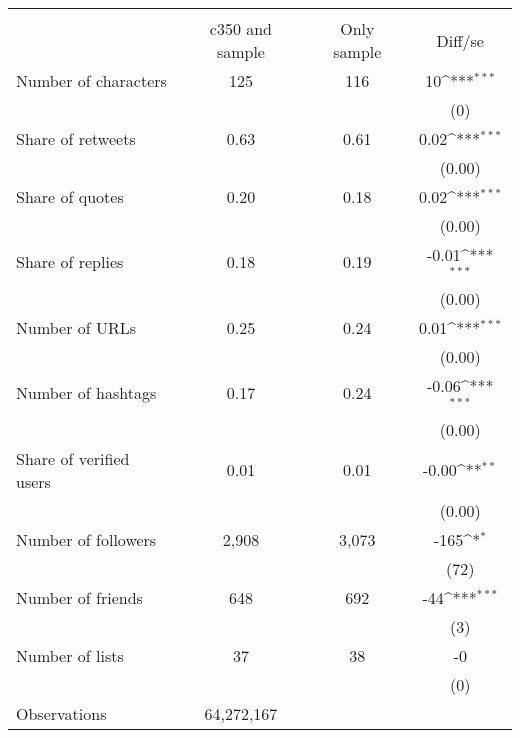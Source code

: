 {
\def\sym#1{\ifmmode^{#1}\else\(^{#1}\)\fi}
\begin{tabular}{l*{1}{ccc}}
\hline\hline
                    &\multicolumn{3}{c}{}                           \\
                    &c350 and sample& Only sample&     Diff/se         \\
\hline
Number of characters&         125&         116&          10\sym{***}\\
                    &            &            &         (0)         \\
Share of retweets   &        0.63&        0.61&        0.02\sym{***}\\
                    &            &            &      (0.00)         \\
Share of quotes     &        0.20&        0.18&        0.02\sym{***}\\
                    &            &            &      (0.00)         \\
Share of replies    &        0.18&        0.19&       -0.01\sym{***}\\
                    &            &            &      (0.00)         \\
Number of URLs      &        0.25&        0.24&        0.01\sym{***}\\
                    &            &            &      (0.00)         \\
Number of hashtags  &        0.17&        0.24&       -0.06\sym{***}\\
                    &            &            &      (0.00)         \\
Share of verified users&        0.01&        0.01&       -0.00\sym{**} \\
                    &            &            &      (0.00)         \\
Number of followers &       2,908&       3,073&        -165\sym{*}  \\
                    &            &            &        (72)         \\
Number of friends   &         648&         692&         -44\sym{***}\\
                    &            &            &         (3)         \\
Number of lists     &          37&          38&          -0         \\
                    &            &            &         (0)         \\
\hline
Observations        &  64,272,167&            &                     \\
\hline\hline
\end{tabular}
}
